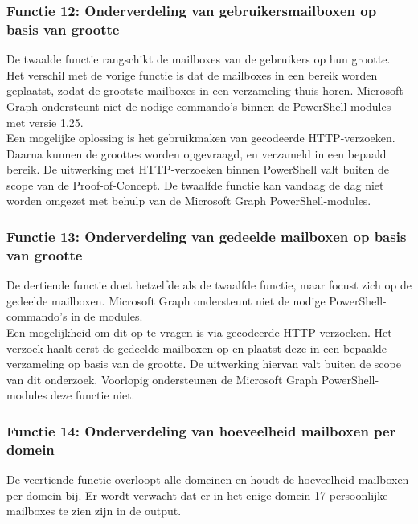 \subsubsection{Functie 12: Onderverdeling van gebruikersmailboxen op basis van grootte}

De twaalde functie rangschikt de mailboxes van de gebruikers op hun grootte. Het verschil met de vorige functie is dat de mailboxes in een bereik worden geplaatst, zodat de grootste mailboxes in een verzameling thuis horen. Microsoft Graph ondersteunt niet de nodige commando's binnen de PowerShell-modules met versie 1.25. \\ 

Een mogelijke oplossing is het gebruikmaken van gecodeerde \ac{HTTP}-verzoeken. Daarna kunnen de groottes worden opgevraagd, en verzameld in een bepaald bereik. De uitwerking met \ac{HTTP}-verzoeken binnen PowerShell valt buiten de scope van de Proof-of-Concept. De twaalfde functie kan vandaag de dag niet worden omgezet met behulp van de Microsoft Graph PowerShell-modules.

\subsubsection{Functie 13: Onderverdeling van gedeelde mailboxen op basis van grootte}

De dertiende functie doet hetzelfde als de twaalfde functie, maar focust zich op de gedeelde mailboxen. Microsoft Graph ondersteunt niet de nodige PowerShell-commando's in de modules. \\

Een mogelijkheid om dit op te vragen is via gecodeerde \ac{HTTP}-verzoeken. Het verzoek haalt eerst de gedeelde mailboxen op en plaatst deze in een bepaalde verzameling op basis van de grootte. De uitwerking hiervan valt buiten de scope van dit onderzoek. Voorlopig ondersteunen de Microsoft Graph PowerShell-modules deze functie niet.

\subsubsection{Functie 14: Onderverdeling van hoeveelheid mailboxen per domein}

De veertiende functie overloopt alle domeinen en houdt de hoeveelheid mailboxen per domein bij. Er wordt verwacht dat er in het enige domein 17 persoonlijke mailboxes te zien zijn in de output. \\

